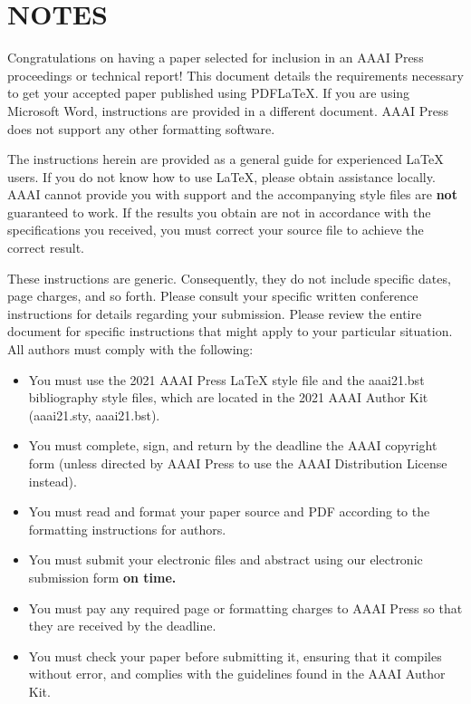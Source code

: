 \documentclass[letterpaper]{article} \usepackage{aaai21}  \usepackage{times}  \usepackage{helvet} \usepackage{courier}  \usepackage[hyphens]{url}  \usepackage{graphicx} \urlstyle{rm} \def\UrlFont{\rm}  \usepackage{natbib}  \usepackage{caption} \frenchspacing  \setlength{\pdfpagewidth}{8.5in}  \setlength{\pdfpageheight}{11in}  \usepackage{cite}
\begin{document}
\iffalse

\section{NOTES}

\noindent Congratulations on having a paper selected for inclusion in an AAAI Press proceedings or technical report! This document details the requirements necessary to get your accepted paper published using PDF\LaTeX{}. If you are using Microsoft Word, instructions are provided in a different document. AAAI Press does not support any other formatting software.

The instructions herein are provided as a general guide for experienced \LaTeX{} users. If you do not know how to use \LaTeX{}, please obtain assistance locally. AAAI cannot provide you with support and the accompanying style files are \textbf{not} guaranteed to work. If the results you obtain are not in accordance with the specifications you received, you must correct your source file to achieve the correct result.

These instructions are generic. Consequently, they do not include specific dates, page charges, and so forth. Please consult your specific written conference instructions for details regarding your submission. Please review the entire document for specific instructions that might apply to your particular situation. All authors must comply with the following:

\begin{itemize}
\item You must use the 2021 AAAI Press \LaTeX{} style file and the aaai21.bst bibliography style files, which are located in the 2021 AAAI Author Kit (aaai21.sty, aaai21.bst).
\item You must complete, sign, and return by the deadline the AAAI copyright form (unless directed by AAAI Press to use the AAAI Distribution License instead).
\item You must read and format your paper source and PDF according to the formatting instructions for authors.
\item You must submit your electronic files and abstract using our electronic submission form \textbf{on time.}
\item You must pay any required page or formatting charges to AAAI Press so that they are received by the deadline.
\item You must check your paper before submitting it, ensuring that it compiles without error, and complies with the guidelines found in the AAAI Author Kit.
\end{itemize}
\end{document}
